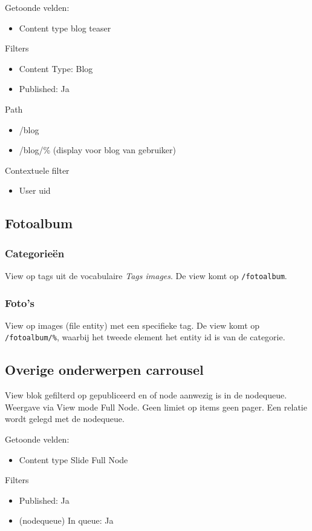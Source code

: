 Getoonde velden: 
\begin{itemize}
\item Content type blog teaser
\end{itemize}

Filters
\begin{itemize}
\item Content Type: Blog
\item Published: Ja
\end{itemize}

Path
\begin{itemize}
\item /blog
\item /blog/\% (display voor blog van gebruiker)
\end{itemize}

Contextuele filter
\begin{itemize}
\item User uid
\end{itemize}

\subsection{Fotoalbum}
\subsubsection{Categorie\"{e}n}
View op tags uit de vocabulaire \emph{Tags images}. De view komt op \texttt{/fotoalbum}.
\subsubsection{Foto's}
View op images (file entity) met een specifieke tag. De view komt op \texttt{/fotoalbum/\%}, waarbij het tweede element het entity id is van de categorie.


\subsection{Overige onderwerpen carrousel}
View blok gefilterd op gepubliceerd en of node aanwezig is in de nodequeue. Weergave via View mode Full Node. Geen limiet op items geen pager. Een relatie wordt gelegd met de nodequeue.

Getoonde velden: 
\begin{itemize}
\item Content type Slide Full Node
\end{itemize}

Filters
\begin{itemize}
\item Published: Ja
\item (nodequeue) In queue: Ja
\end{itemize}

